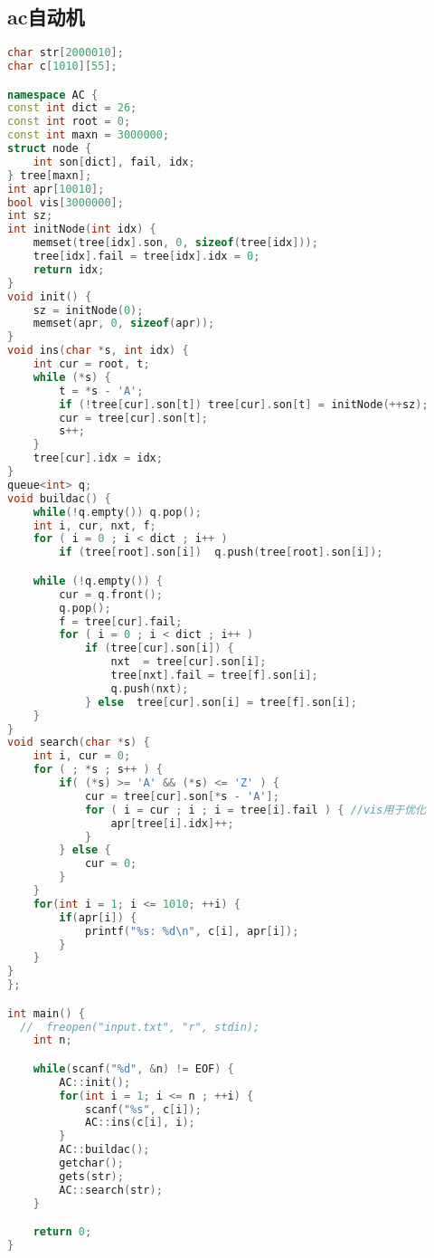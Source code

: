 \subsection{ac自动机}
		\begin{lstlisting}[language=c++]	
char str[2000010];
char c[1010][55];

namespace AC {
const int dict = 26;
const int root = 0;
const int maxn = 3000000;
struct node {
    int son[dict], fail, idx;
} tree[maxn];
int apr[10010];
bool vis[3000000];
int sz;
int initNode(int idx) {
    memset(tree[idx].son, 0, sizeof(tree[idx]));
    tree[idx].fail = tree[idx].idx = 0;
    return idx;
}
void init() {
    sz = initNode(0);
    memset(apr, 0, sizeof(apr));
}
void ins(char *s, int idx) {
    int cur = root, t;
    while (*s) {
        t = *s - 'A';
        if (!tree[cur].son[t]) tree[cur].son[t] = initNode(++sz);
        cur = tree[cur].son[t];
        s++;
    }
    tree[cur].idx = idx;
}
queue<int> q;
void buildac() {
    while(!q.empty()) q.pop();
    int i, cur, nxt, f;
    for ( i = 0 ; i < dict ; i++ )
        if (tree[root].son[i])	q.push(tree[root].son[i]);

    while (!q.empty()) {
        cur = q.front();
        q.pop();
        f = tree[cur].fail;
        for ( i = 0 ; i < dict ; i++ )
            if (tree[cur].son[i]) {
                nxt  = tree[cur].son[i];
                tree[nxt].fail = tree[f].son[i];
                q.push(nxt);
            } else	tree[cur].son[i] = tree[f].son[i];
    }
}
void search(char *s) {
    int i, cur = 0;
    for ( ; *s ; s++ ) {
        if( (*s) >= 'A' && (*s) <= 'Z' ) {
            cur = tree[cur].son[*s - 'A'];
            for ( i = cur ; i ; i = tree[i].fail ) { //vis用于优化
                apr[tree[i].idx]++;
            }
        } else {
            cur = 0;
        }
    }
    for(int i = 1; i <= 1010; ++i) {
        if(apr[i]) {
            printf("%s: %d\n", c[i], apr[i]);
        }
    }
}
};

int main() {
  //  freopen("input.txt", "r", stdin);
    int n;

    while(scanf("%d", &n) != EOF) {
        AC::init();
        for(int i = 1; i <= n ; ++i) {
            scanf("%s", c[i]);
            AC::ins(c[i], i);
        }
        AC::buildac();
        getchar();
        gets(str);
        AC::search(str);
    }

    return 0;
}
		\end{lstlisting}
